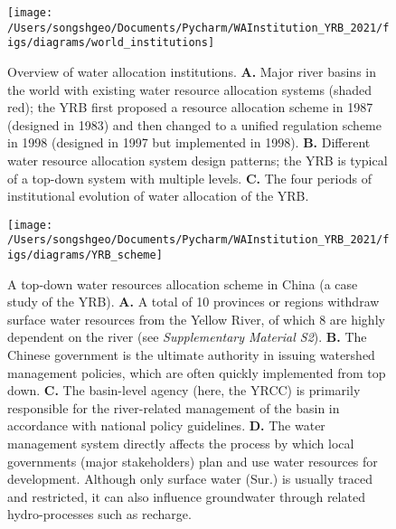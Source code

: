 \documentclass{article}
\begin{document}
\begin{figure}[!htb]
    \centering
    \texttt{[image: /Users/songshgeo/Documents/Pycharm/WAInstitution\_YRB\_2021/figs/diagrams/world\_institutions]}
	\caption{
		Overview of water allocation institutions.
		\textbf{A.} Major river basins in the world with existing water resource allocation systems (shaded red); the YRB first proposed a resource allocation scheme in 1987 (designed in 1983) and then changed to a unified regulation scheme in 1998 (designed in 1997 but implemented in 1998).
		\textbf{B.} Different water resource allocation system design patterns; the YRB is typical of a top-down system with multiple levels.
		\textbf{C.} The four periods of institutional evolution of water allocation of the YRB.
	}
    \label{fig:world}
\end{figure}

\begin{figure}[!htb]
    \centering
	\texttt{[image: /Users/songshgeo/Documents/Pycharm/WAInstitution\_YRB\_2021/figs/diagrams/YRB\_scheme]}
	\caption{
		A top-down water resources allocation scheme in China (a case study of the YRB).
		\textbf{A.} A total of 10 provinces or regions withdraw surface water resources from the Yellow River, of which 8 are highly dependent on the river (see \textit{Supplementary Material S2}).
		\textbf{B.} The Chinese government is the ultimate authority in issuing watershed management policies, which are often quickly implemented from top down.
		\textbf{C.} The basin-level agency (here, the YRCC) is primarily responsible for the river-related management of the basin in accordance with national policy guidelines.
		\textbf{D.} The water management system directly affects the process by which local governments (major stakeholders) plan and use water resources for development. Although only surface water (Sur.) is usually traced and restricted, it can also influence groundwater through related hydro-processes such as recharge.
	}
	\label{fig:framework}
\end{figure}
\end{document}
